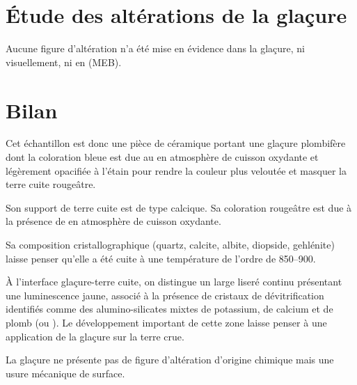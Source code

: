 \section{Étude des altérations de la glaçure}

Aucune figure d'altération n'a été mise en évidence dans la glaçure, 
ni visuellement, ni en \MEB[ie] (MEB).


\section{Bilan}

Cet échantillon est donc une pièce de céramique portant une glaçure 
plombifère dont la coloration bleue est due au  en 
atmosphère de cuisson oxydante et légèrement opacifiée à l'étain pour 
rendre la couleur plus veloutée et masquer la terre cuite rougeâtre.

Son support de terre cuite est de type calcique. Sa coloration 
rougeâtre est due à la présence de  en atmosphère de cuisson 
oxydante.

Sa composition cristallographique (quartz, calcite, albite, diopside, 
gehlénite) laisse penser qu'elle a été cuite à une température de 
l'ordre de \SIrange[range-phrase=\ à\ ]{850}{900}{\degC}.

À l'interface glaçure-terre cuite, on distingue un large liseré 
continu présentant une luminescence jaune, associé à la présence de 
cristaux de dévitrification identifiés comme des alumino-silicates 
mixtes de potassium, de calcium et de plomb (ou ). Le développement important de cette zone laisse penser à
une application de la glaçure sur la terre crue.

La glaçure ne présente pas de figure d'altération d'origine chimique 
mais une usure mécanique de surface.
